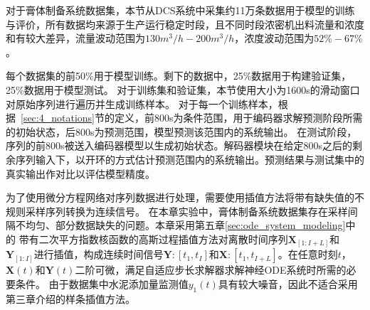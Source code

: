 对于膏体制备系统数据集，本节从DCS系统中采集约11万条数据用于模型的训练与评价，所有数据均来源于生产运行稳定时段，且不同时段浓密机出料流量和浓度和有较大差异，流量波动范围为$130m^3/h-200m^3/h$，浓度波动范围为$52\%-67\%$。

每个数据集的前50\%用于模型训练。剩下的数据中，25\%数据用于构建验证集，25\%数据用于模型测试。
对于训练集和验证集，本节使用大小为1600s的滑动窗口对原始序列进行遍历并生成训练样本。
对于每一个训练样本，根据~\ref{sec:4_notations}节的定义，前800s为条件范围，用于编码器求解预测阶段所需的初始状态，后800s为预测范围，模型预测该范围内的系统输出。
在测试阶段，序列的前800s被送入编码器模型以生成初始状态。解码器模块在给定800s之后的剩余序列输入下，以开环的方式估计预测范围内的系统输出。预测结果与测试集中的真实输出作对比以评估模型精度。

为了使用微分方程网络对序列数据进行处理，需要使用插值方法将带有缺失值的不规则采样序列转换为连续信号。
在本章实验中，膏体制备系统数据集存在采样间隔不均匀、部分数据缺失的问题。本章采用第五章\ref{sec:ode_system_modeling}中的
带有二次平方指数核函数的高斯过程插值方法对离散时间序列$\boldsymbol X_{[1:I+L]}$和$\boldsymbol Y_{[1:I]}$进行插值，构成连续时间信号$\boldsymbol Y:[t_1,t_{I}]$和$\boldsymbol X:[t_1,t_{I+L}]$。在任意时刻$t$，  $\boldsymbol X(t)$和$\boldsymbol Y(t)$二阶可微，满足自适应步长求解器求解神经ODE系统时所需的必要条件\cite{kidger2020neural}。
由于数据集中水泥添加量监测值$y_1(t)$具有较大噪音，因此不适合采用第三章介绍的样条插值方法。


